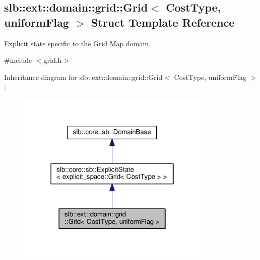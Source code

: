 \hypertarget{structslb_1_1ext_1_1domain_1_1grid_1_1Grid}{}\subsection{slb\+:\+:ext\+:\+:domain\+:\+:grid\+:\+:Grid$<$ Cost\+Type, uniform\+Flag $>$ Struct Template Reference}
\label{structslb_1_1ext_1_1domain_1_1grid_1_1Grid}


Explicit state specific to the \hyperlink{structslb_1_1ext_1_1domain_1_1grid_1_1Grid}{Grid} Map domain.  




{\ttfamily \#include $<$grid.\+h$>$}



Inheritance diagram for slb\+:\+:ext\+:\+:domain\+:\+:grid\+:\+:Grid$<$ Cost\+Type, uniform\+Flag $>$\+:\nopagebreak
\begin{figure}[H]
\begin{center}
\leavevmode
\includegraphics[width=262pt]{structslb_1_1ext_1_1domain_1_1grid_1_1Grid__inherit__graph}
\end{center}
\end{figure}


